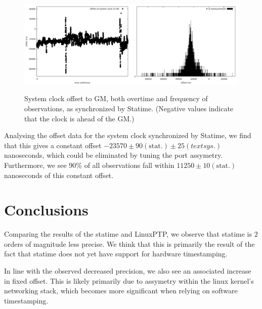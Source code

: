 \documentclass{article}
\begin{document}
\begin{figure}[h]
\includegraphics[width=0.5\textwidth]{gm_statime_offset_overtime.pdf}\includegraphics[width=0.5\textwidth]{gm_statime_offset.pdf}
\caption{System clock offset to GM, both overtime and frequency of observations, as synchronized by Statime. (Negative values indicate that the clock is ahead of the GM.)}
\label{fig:statime_sys_offset}
\end{figure}

Analysing the offset data for the system clock synchronized by Statime, we find that this gives a constant offset $-23570\pm 90(\text{stat.})\pm 25 (text{sys.})$ nanoseconds, which could be eliminated by tuning the port assymetry. Furthermore, we see 90\% of all observations fall within $11250 \pm 10(\text{stat.})$ nanoseconds of this constant offset.

\section{Conclusions}

Comparing the results of the statime and LinuxPTP, we observe that statime is $2$ orders of magnitude less precise. We think that this is primarily the result of the fact that statime does not yet have support for hardware timestamping.

In line with the observed decreased precision, we also see an associated increase in fixed offset. This is likely primarily due to assymetry within the linux kernel's networking stack, which becomes more significant when relying on software timestamping.
\end{document}
